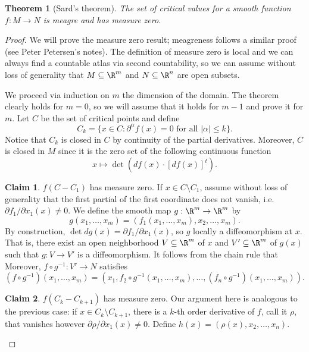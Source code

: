 \documentclass[reqno]{amsart}
\newtheorem{theorem}{Theorem}
\theoremstyle{definition}
\newtheorem*{claim}{Claim}
\theoremstyle{remark}
\begin{document}
\begin{theorem}[Sard's theorem]
	The set of critical values for a smooth function $f: M \to N$ is meagre and has measure zero. 
\end{theorem}

\begin{proof}
	We will prove the measure zero result; meagreness follows a similar proof (see Peter Petersen's notes).  The definition of measure zero is local and we can always find a countable atlas via second countability, so we can assume without loss of generality that $M \subseteq \R^m$ and $N \subseteq \R^n$ are open subsets. 
	
	We proceed via induction on $m$ the dimension of the domain. The theorem clearly holds for $m = 0$, so we will assume that it holds for $m - 1$ and prove it for $m$. Let $C$ be the set of critical points and define
		\[ C_k = \{ x \in C : \partial^\alpha f (x) = 0 \text{ for all } |\alpha| \leq k \}.\]
	Notice that $C_k$ is closed in $C$ by continuity of the partial derivatives. Moreover, $C$ is closed in $M$ since it is the zero set of the following continuous function 
		\[ x \mapsto \det (df(x) \cdot [df(x)]^t). \]
	\begin{claim}
		$f(C - C_1)$ has measure zero. If $x \in C \setminus C_1$, assume without loss of generality that the first partial of the first coordinate does not vanish, i.e. $\partial f_1 / \partial x_1 (x) \neq 0$. We define the smooth map $g: \R^m \to \R^m$ by 
			\[ g(x_1, \dots, x_m) = (f_1 (x_1, \dots, x_m) , x_2, \dots, x_m). \]
		By construction, $\det dg (x) = \partial f_1 / \partial x_1 (x)$, so $g$ locally a diffeomorphism at $x$. That is, there exist an open neighborhood $V \subseteq \R^m$ of $x$ and $V' \subseteq \R^m$ of $g(x)$ such that $g : V \to V'$ is a diffeomorphism. It follows from the chain rule that 
			\[  \]
		Moreover, $f \circ g^{-1} : V' \to N$ satisfies
			\[ (f \circ g^{-1})(x_1, \dots, x_m) = (x_1, f_2 \circ g^{-1} (x_1, \dots, x_m), \dots, (f_n \circ g^{-1})(x_1, \dots, x_m)). \]
			
			
	\end{claim}
	
	\begin{claim}
		$f(C_k - C_{k + 1})$ has measure zero. Our argument here is analogous to the previous case: if $x \in C_k \setminus C_{k + 1}$, there is a $k$-th order derivative of $f$, call it $\rho$, that vanishes however $\partial \rho /\partial x_1 (x) \neq 0$. Define $h(x) = (\rho(x), x_2, \dots, x_n)$.
		

\end{claim}
\end{proof}
\end{document}
